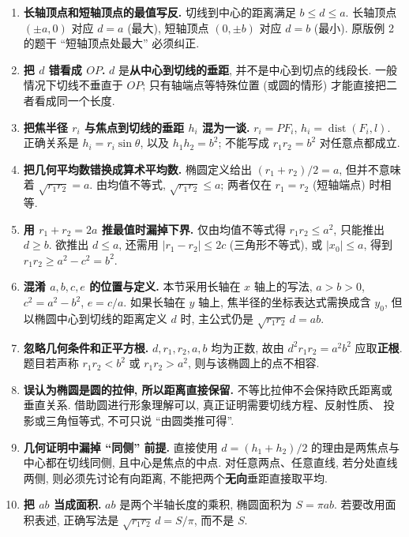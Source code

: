 \begin{trapbox}
\begin{enumerate}
\item \textbf{长轴顶点和短轴顶点的最值写反.}
切线到中心的距离满足 $b\le d\le a$.
长轴顶点 $(\pm a,0)$ 对应 $d=a$ (最大),
短轴顶点 $(0,\pm b)$ 对应 $d=b$ (最小).
原版例 2 的题干 ``短轴顶点处最大'' 必须纠正.

\item \textbf{把 $d$ 错看成 $OP$.}
$d$ 是\textbf{从中心到切线的垂距}, 并不是中心到切点的线段长.
一般情况下切线不垂直于 $OP$;
只有轴端点等特殊位置 (或圆的情形) 才能直接把二者看成同一个长度.

\item \textbf{把焦半径 $r_i$ 与焦点到切线的垂距 $h_i$ 混为一谈.}
$r_i=PF_i$, $h_i=\operatorname{dist}(F_i,l)$.
正确关系是 $h_i=r_i\sin\theta$,
以及 $h_1h_2=b^2$; 不能写成 $r_1r_2=b^2$ 对任意点都成立.

\item \textbf{把几何平均数错换成算术平均数.}
椭圆定义给出 $(r_1+r_2)/2=a$, 但并不意味着
$\sqrt{r_1r_2}=a$.
由均值不等式, $\sqrt{r_1r_2}\le a$;
两者仅在 $r_1=r_2$ (短轴端点) 时相等.

\item \textbf{用 $r_1+r_2=2a$ 推最值时漏掉下界.}
仅由均值不等式得 $r_1r_2\le a^2$, 只能推出 $d\ge b$.
欲推出 $d\le a$, 还需用
$|r_1-r_2|\le 2c$ (三角形不等式), 或 $|x_0|\le a$,
得到 $r_1r_2\ge a^2-c^2=b^2$.

\item \textbf{混淆 $a,b,c,e$ 的位置与定义.}
本节采用长轴在 $x$ 轴上的写法, $a>b>0$,
$c^2=a^2-b^2$, $e=c/a$.
如果长轴在 $y$ 轴上, 焦半径的坐标表达式需换成含 $y_0$,
但以椭圆中心到切线的距离定义 $d$ 时, 主公式仍是
$\sqrt{r_1r_2}\,d=ab$.

\item \textbf{忽略几何条件和正平方根.}
$d,r_1,r_2,a,b$ 均为正数, 故由
$d^2r_1r_2=a^2b^2$ 应取\textbf{正根}.
题目若声称 $r_1r_2<b^2$ 或 $r_1r_2>a^2$, 则与该椭圆上的点不相容.

\item \textbf{误认为椭圆是圆的拉伸, 所以距离直接保留.}
不等比拉伸不会保持欧氏距离或垂直关系.
借助圆进行形象理解可以, 真正证明需要切线方程、反射性质、
投影或三角恒等式, 不可只说 ``由圆类推可得''.

\item \textbf{几何证明中漏掉 ``同侧'' 前提.}
直接使用 $d=(h_1+h_2)/2$ 的理由是两焦点与中心都在切线同侧,
且中心是焦点的中点. 对任意两点、任意直线, 若分处直线两侧,
则必须先讨论有向距离, 不能把两个\textbf{无向}垂距直接取平均.

\item \textbf{把 $ab$ 当成面积.}
$ab$ 是两个半轴长度的乘积, 椭圆面积为 $S=\pi ab$.
若要改用面积表述, 正确写法是
$\sqrt{r_1r_2}\,d=S/\pi$, 而不是 $S$.
\end{enumerate}
\end{trapbox}
